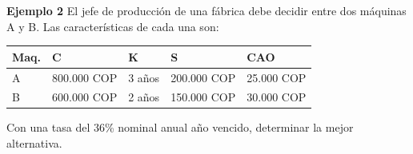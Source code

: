 \textbf{Ejemplo 2}\newline
El jefe de producción de una fábrica debe decidir entre dos máquinas A y B. Las características de cada una son: \\
\begin{center}
		\begin{tabular}{|p{1cm}|p{2cm}|p{2cm}|p{2cm}|p{3cm}|}
			\hline
			\rowcolor{white!50}
			\textbf{Maq.} & \textbf{C} & \textbf{K} & \textbf{S} & \textbf{CAO} \\ \hline
			A            & 800.000 COP   & 3 años     & 200.000 COP    & 25.000 COP       \\ \hline
			B            & 600.000 COP   & 2 años     & 150.000 COP    & 30.000 COP       \\ \hline
		\end{tabular}
\end{center}

Con una tasa del 36\% nominal anual año vencido, determinar la mejor alternativa.

